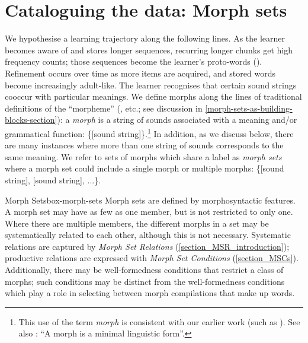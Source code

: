 \section{Cataloguing the data: Morph sets}\label{section_intro_morph-set}
We hypothesise a learning trajectory along the following lines. As the learner becomes aware of  and stores longer sequences,  recurring longer chunks get high frequency counts; those sequences become the learner's proto-words (\citealt{Martin+:2013}).  Refinement occurs over time as more items are acquired, and stored words become increasingly adult-like. The learner recognises that certain sound strings cooccur with particular meanings. We define morphs along the lines of traditional definitions of the ``morpheme'' (\citealt{Bloomfield:1933}, etc.; see discussion in \textsection\ref{morph-sets-as-building-blocks-section}): a \textit{morph} is a string of sounds associated with a meaning and/or grammatical function: \{[sound string]\}.\footnote{This use of the term \textit{morph} is consistent with our earlier work (such as \citealt{Archangeli+:2015_Frontiers, Archangeli+:2018routledge, Archangeli+:2018Henry}). See also \citet[117]{Haspelmath:2020morph}:  ``A morph is a minimal linguistic form''.} In addition, as we discuss below, there are many instances where more than one string of sounds corresponds to the same meaning. We refer to sets of morphs which share a label as \textit{morph sets} where a morph set could include a single morph or multiple morphs: \{[sound string], [sound string], ...\}.

\begin{dadpbox}{Morph Sets}{box-morph-sets}
Morph sets are defined by morphosyntactic features. A morph set may have as few as one member, but is not restricted to only one. Where there are multiple members, the different morphs in a set may be systematically related to each other, although this is not necessary. Systematic relations are captured by \textit{Morph Set Relations} (\ref{section_MSR_introduction}); productive relations are expressed with \textit{Morph Set Conditions} (\ref{section_MSCs}). Additionally, there may be well-formedness conditions that restrict a class of morphs; such conditions may be distinct from the well-formedness conditions which play a role in selecting between morph compilations that make up words.
\end{dadpbox}

